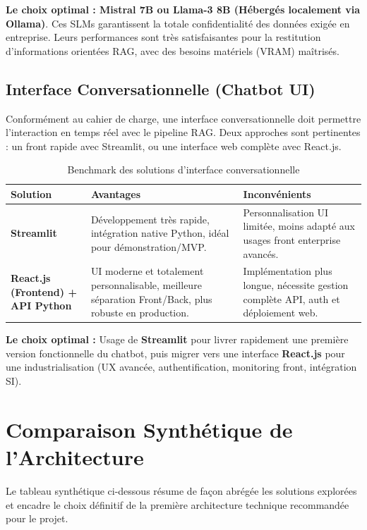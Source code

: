 \documentclass[12pt,a4paper]{article}
\begin{document}
\textbf{Le choix optimal : Mistral 7B ou Llama-3 8B (Hébergés localement via Ollama)}. Ces SLMs garantissent la totale confidentialité des données exigée en entreprise. Leurs performances sont très satisfaisantes pour la restitution d'informations orientées RAG, avec des besoins matériels (VRAM) maîtrisés.

\subsection{Interface Conversationnelle (Chatbot UI)}
Conformément au cahier de charge, une interface conversationnelle doit permettre l'interaction en temps réel avec le pipeline RAG. Deux approches sont pertinentes : un front rapide avec Streamlit, ou une interface web complète avec React.js.

\begin{table}[H]
    \centering
    \renewcommand{\arraystretch}{1.5}
    \begin{tabularx}{\textwidth}{|X|X|X|}
        \hline
        \textbf{Solution} & \textbf{Avantages} & \textbf{Inconvénients} \\
        \hline
        \textbf{Streamlit} & Développement très rapide, intégration native Python, idéal pour démonstration/MVP. & Personnalisation UI limitée, moins adapté aux usages front enterprise avancés. \\
        \hline
        \textbf{React.js (Frontend) + API Python} & UI moderne et totalement personnalisable, meilleure séparation Front/Back, plus robuste en production. & Implémentation plus longue, nécessite gestion complète API, auth et déploiement web. \\
        \hline
    \end{tabularx}
    \caption{Benchmark des solutions d'interface conversationnelle}
\end{table}

\textbf{Le choix optimal :} Usage de \textbf{Streamlit} pour livrer rapidement une première version fonctionnelle du chatbot, puis migrer vers une interface \textbf{React.js} pour une industrialisation (UX avancée, authentification, monitoring front, intégration SI).

\clearpage
\section{Comparaison Synthétique de l'Architecture}

Le tableau synthétique ci-dessous résume de façon abrégée les solutions explorées et encadre le choix définitif de la première architecture technique recommandée pour le projet.
\end{document}
